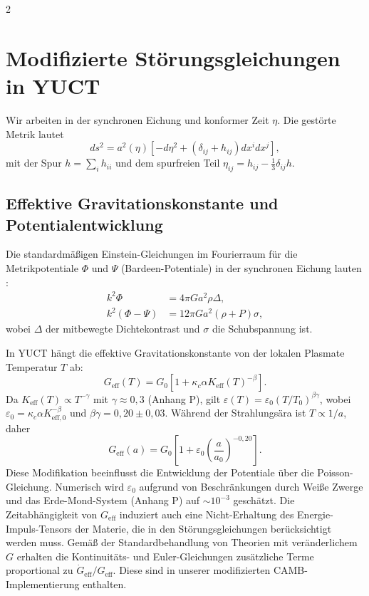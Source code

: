 \documentclass[11pt,a4paper]{article}
\begin{document}
\begin{multicols}{2}
		\section{Modifizierte Störungsgleichungen in YUCT}
		
		Wir arbeiten in der synchronen Eichung und konformer Zeit $\eta$. Die gestörte Metrik lautet
		\begin{equation}
			ds^2 = a^2(\eta)\left[ -d\eta^2 + (\delta_{ij} + h_{ij}) dx^i dx^j \right],
		\end{equation}
		mit der Spur $h = \sum_i h_{ii}$ und dem spurfreien Teil $\eta_{ij} = h_{ij} - \frac{1}{3}\delta_{ij}h$.
		
		\subsection{Effektive Gravitationskonstante und Potentialentwicklung}
		
		Die standardmäßigen Einstein-Gleichungen im Fourierraum für die Metrikpotentiale $\Phi$ und $\Psi$ (Bardeen-Potentiale) in der synchronen Eichung lauten \cite{Ma1995}:
		\begin{align}
			k^2 \Phi &= 4\pi G a^2 \rho \Delta, \\
			k^2 (\Phi - \Psi) &= 12\pi G a^2 (\rho+P) \sigma,
		\end{align}
		wobei $\Delta$ der mitbewegte Dichtekontrast und $\sigma$ die Schubspannung ist.
		
		In YUCT hängt die effektive Gravitationskonstante von der lokalen Plasmate Temperatur $T$ ab:
		\begin{equation}
			G_{\mathrm{eff}}(T) = G_0\left[1 + \kappa_c \alpha K_{\mathrm{eff}}(T)^{-\beta}\right].
			\label{eq:Geff}
		\end{equation}
		Da $K_{\mathrm{eff}}(T) \propto T^{-\gamma}$ mit $\gamma \approx 0,3$ (Anhang P), gilt $\varepsilon(T) = \varepsilon_0 (T/T_0)^{\beta\gamma}$, wobei $\varepsilon_0 = \kappa_c \alpha K_{\mathrm{eff},0}^{-\beta}$ und $\beta\gamma = 0,20 \pm 0,03$. Während der Strahlungsära ist $T \propto 1/a$, daher
		\begin{equation}
			G_{\mathrm{eff}}(a) = G_0\left[1 + \varepsilon_0 \left(\frac{a}{a_0}\right)^{-0,20}\right].
			\label{eq:Geff_a}
		\end{equation}
		Diese Modifikation beeinflusst die Entwicklung der Potentiale über die Poisson-Gleichung. Numerisch wird $\varepsilon_0$ aufgrund von Beschränkungen durch Weiße Zwerge und das Erde-Mond-System (Anhang P) auf $\sim 10^{-3}$ geschätzt. Die Zeitabhängigkeit von $G_{\mathrm{eff}}$ induziert auch eine Nicht-Erhaltung des Energie-Impuls-Tensors der Materie, die in den Störungsgleichungen berücksichtigt werden muss. Gemäß der Standardbehandlung von Theorien mit veränderlichem $G$ \cite{Uzan2011} erhalten die Kontinuitäts- und Euler-Gleichungen zusätzliche Terme proportional zu $\dot{G}_{\mathrm{eff}}/G_{\mathrm{eff}}$. Diese sind in unserer modifizierten CAMB-Implementierung enthalten.
		

\end{multicols}
\end{document}
